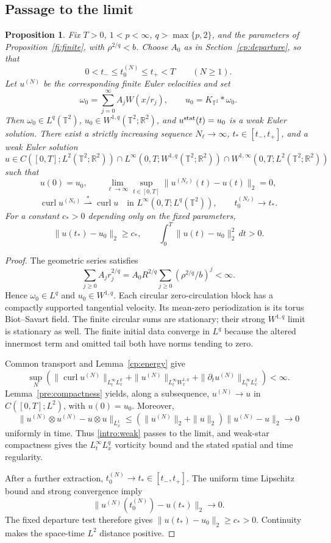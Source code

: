 \documentclass[11pt]{amsart}
\newtheorem{proposition}[theorem]{Proposition}
\theoremstyle{remark}
\numberwithin{equation}{section}
\newcommand{\R}{\mathbb R}
\newcommand{\T}{\mathbb T}
\begin{document}
\subsection{Passage to the limit}
\begin{proposition}
\label{cp:limit}
Fix $T>0$, $1<p<\infty$, $q>\max\{p,2\}$, and the parameters of
Proposition~\ref{fi:finite}, with $\rho^{2/q}<b$. Choose $A_0$ as
in Section~\ref{cp:departure}, so that
\[
 0<t_-\le t_0^{(N)}\le t_+<T\qquad(N\ge1).
\]
Let $u^{(N)}$ be the corresponding finite Euler velocities and set
\[
 \omega_0=\sum_{j=0}^\infty A_jW(x/r_j),\qquad
 u_0=K_{\T^2}*\omega_0.
\]
Then $\omega_0\in L^q(\T^2)$, $u_0\in W^{1,q}(\T^2;\R^2)$,
and $u^{\rm stat}(t)=u_0$ is a weak Euler solution.
There exist a strictly increasing sequence $N_\ell\to\infty$,
$t_*\in[t_-,t_+]$, and a weak Euler solution
\[
 u\in C([0,T];L^2(\T^2;\R^2))
       \cap L^\infty(0,T;W^{1,q}(\T^2;\R^2))
       \cap W^{1,\infty}(0,T;L^2(\T^2;\R^2))
\]
such that
\[
 u(0)=u_0,\qquad
 \lim_{\ell\to\infty}\sup_{t\in[0,T]}
       \|u^{(N_\ell)}(t)-u(t)\|_2=0,
\]
\[
 \operatorname{curl}u^{(N_\ell)}
       \stackrel{*}{\rightharpoonup}\operatorname{curl}u
       \quad\text{in }L^\infty(0,T;L^q(\T^2)),\qquad
 t_0^{(N_\ell)}\longrightarrow t_*.
\]
For a constant $c_*>0$ depending only on the fixed parameters,
\[
 \|u(t_*)-u_0\|_2\ge c_*,\qquad
 \int_0^T\|u(t)-u_0\|_2^2\,dt>0.
\]
\end{proposition}
\begin{proof}
The geometric series satisfies
\[
 \sum_{j\ge0}A_jr_j^{2/q}
 =A_0R^{2/q}\sum_{j\ge0}(\rho^{2/q}/b)^j<\infty.
\]
Hence $\omega_0\in L^q$ and $u_0\in W^{1,q}$.
Each circular zero-circulation block has a compactly supported
tangential velocity. Its mean-zero periodization is its torus
Biot--Savart field. The finite circular sums are stationary;
their strong $W^{1,q}$ limit is stationary as well.
The finite initial data converge in $L^q$ because the altered
innermost term and omitted tail both have norms tending to zero.

Common transport and Lemma~\ref{cp:energy} give
\[
 \sup_N\left(\|\operatorname{curl}u^{(N)}\|_{L^\infty_tL^q_x}
       +\|u^{(N)}\|_{L^\infty_tW^{1,q}_x}
       +\|\partial_tu^{(N)}\|_{L^\infty_tL^2_x}\right)<\infty.
\]
Lemma~\ref{pre:compactness} yields, along a subsequence,
$u^{(N)}\to u$ in $C([0,T];L^2)$, with $u(0)=u_0$.
Moreover,
\[
 \|u^{(N)}\otimes u^{(N)}-u\otimes u\|_{L^1_x}
 \le(\|u^{(N)}\|_2+\|u\|_2)\|u^{(N)}-u\|_2\longrightarrow0
\]
uniformly in time. Thus \eqref{intro:weak} passes to the limit,
and weak-star compactness gives the $L^\infty_tL^q_x$ vorticity
bound and the stated spatial and time regularity.

After a further extraction, $t_0^{(N)}\to t_*\in[t_-,t_+]$.
The uniform time Lipschitz bound and strong convergence imply
\[
 \|u^{(N)}(t_0^{(N)})-u(t_*)\|_2\longrightarrow0.
\]
The fixed departure test therefore gives
$\|u(t_*)-u_0\|_2\ge c_*>0$. Continuity makes the space-time
$L^2$ distance positive.
\end{proof}
\end{document}
